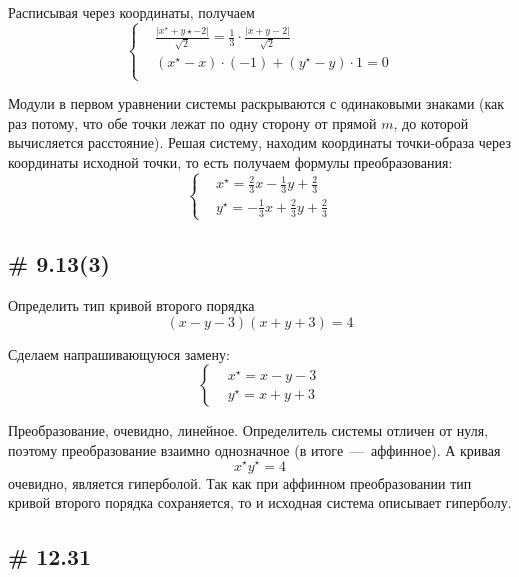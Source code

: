 \documentclass[a4paper,12pt]{article}
\begin{document}
\begin{solution}
    Расписывая через координаты, получаем
    \[
      \left\{
        \begin{aligned}
          &\frac{|x^\star + y\star - 2|}{\sqrt{2}} = \frac{1}{3} \cdot \frac{|x + y - 2|}{\sqrt{2}}\\
          &(x^\star - x) \cdot (-1) + (y^\star - y) \cdot 1 = 0\\
        \end{aligned}
      \right.
    \]
    
    Модули в первом уравнении системы раскрываются с одинаковыми знаками (как раз потому, что обе точки лежат по одну сторону от прямой $m$, до которой вычисляется расстояние).
    Решая систему, находим координаты точки-образа через координаты исходной точки, то есть получаем формулы преобразования:
    \[
      \left\{
        \begin{aligned}
          &x^\star = \frac{2}{3}x - \frac{1}{3}y + \frac{2}{3}\\
          &y^\star = -\frac{1}{3}x + \frac{2}{3}y + \frac{2}{3}
        \end{aligned}
      \right.
    \]
  \end{solution}
  
  
  \subsection{\# 9.13(3)}
  
  Определить тип кривой второго порядка
  \[
    (x - y - 3)(x + y + 3) = 4
  \]
  
  \begin{solution}
    Сделаем напрашивающуюся замену:
    \[
      \left\{
        \begin{aligned}
          &x^\star = x - y - 3\\
          &y^\star = x + y + 3
        \end{aligned}
      \right.
    \]
    
    Преобразование, очевидно, линейное.
    Определитель системы отличен от нуля, поэтому преобразование взаимно однозначное (в итоге~---~аффинное).
    А кривая
    \[
      x^\star y^\star = 4
    \]
    очевидно, является гиперболой.
    Так как при аффинном преобразовании тип кривой второго порядка сохраняется, то и исходная система описывает гиперболу.
  \end{solution}
  
  
  \subsection{\# 12.31}
  
\end{document}
